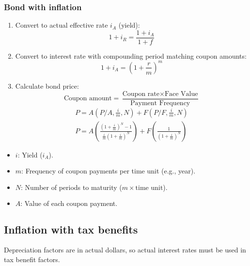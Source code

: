 \subsubsection{Bond with inflation}
    \begin{process}
        \begin{enumerate}
            \item Convert to actual effective rate \( i_A \) (yield):
            \begin{equation}
                1 + i_R = \frac{1 + i_A}{1 + f}
            \end{equation}
        
            \item Convert to interest rate with compounding period matching coupon amounts:
            \begin{equation}
                1 + i_A = \left(1 + \frac{r}{m} \right)^m
            \end{equation}
        
            \item Calculate bond price:
            \begin{equation}
                \text{Coupon amount} = \frac{\text{Coupon rate} \times \text{Face Value}}{\text{Payment Frequency}}
            \end{equation}
            \begin{align}
                P = A\left(P/A, \frac{i}{m}, N\right) + F\left(P/F, \frac{i}{m}, N\right) \\
                P = A \left( \frac{(1+\frac{i}{m})^{N} - 1}{\frac{i}{m} (1 + \frac{i}{m})^N} \right) + F \left( \frac{1}{(1+\frac{i}{m})^N} \right)
            \end{align}
        \end{enumerate}

        \begin{itemize}
            \item \( i \): Yield (\( i_A \)).
            \item \( m \): Frequency of coupon payments per time unit (e.g., year).
            \item \( N \): Number of periods to maturity (\( m \times \text{time unit} \)).
            \item \( A \): Value of each coupon payment.
        \end{itemize}
    \end{process}

\subsection{Inflation with tax benefits}
Depreciation factors are in actual dollars, so actual interest rates must be used in tax benefit factors.


